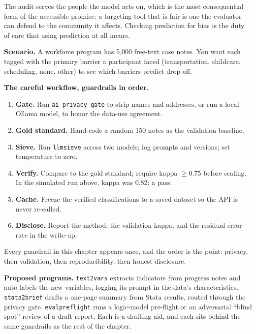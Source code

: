\documentclass[
    a4paper,
    fontsize=10pt,
    twoside=true,
    numbers=noenddot,
]{kaobook}
\newcounter{appliedexample}
\newenvironment{appliedexample}[1][]{%
    \refstepcounter{appliedexample}%
    \begin{appliedexamplebox}[frametitle={Applied Example~\theappliedexample.~~#1}]%
}{%
    \end{appliedexamplebox}%
}
\begin{document}
The audit serves the people the model acts on, which is the most consequential form of the accessible promise: a targeting tool that is fair is one the evaluator can defend to the community it affects. Checking prediction for bias is the duty of care that using prediction at all incurs.

\begin{appliedexample}[Coding 5,000 progress notes without getting burned]
\textbf{Scenario.} A workforce program has 5,000 free-text case notes. You want each tagged with the primary barrier a participant faced (transportation, childcare, scheduling, none, other) to see which barriers predict drop-off.

\medskip
\textbf{The careful workflow, guardrails in order.}
\begin{enumerate}
    \item \textbf{Gate.} Run \texttt{ai\_privacy\_gate} to strip names and addresses, or run a local Ollama model, to honor the data-use agreement.
    \item \textbf{Gold standard.} Hand-code a random 150 notes as the validation baseline.
    \item \textbf{Sieve.} Run \texttt{llmsieve} across two models; log prompts and versions; set temperature to zero.
    \item \textbf{Verify.} Compare to the gold standard; require kappa $\ge 0.75$ before scaling. In the simulated run above, kappa was 0.82: a pass.
    \item \textbf{Cache.} Freeze the verified classifications to a saved dataset so the API is never re-called.
    \item \textbf{Disclose.} Report the method, the validation kappa, and the residual error rate in the write-up.
\end{enumerate}
Every guardrail in this chapter appears once, and the order is the point: privacy, then validation, then reproducibility, then honest disclosure.
\end{appliedexample}

\begin{kaobox}[frametitle={Ado-file Ideas: \texttt{text2vars}, \texttt{stata2brief}, \texttt{evalpreflight}}]
\textbf{Proposed programs.} \texttt{text2vars} extracts indicators from progress notes and auto-labels the new variables, logging its prompt in the data's characteristics. \texttt{stata2brief} drafts a one-page summary from Stata results, routed through the privacy gate. \texttt{evalpreflight} runs a logic-model pre-flight or an adversarial \enquote{blind spot} review of a draft report. Each is a drafting aid, and each sits behind the same guardrails as the rest of the chapter.
\end{kaobox}
\end{document}
